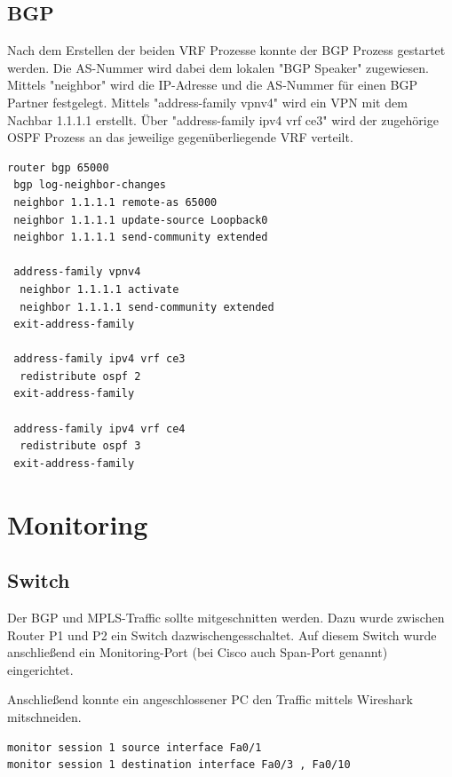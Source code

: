 \section{BGP}

Nach dem Erstellen der beiden \ac{VRF} Prozesse konnte der \ac{BGP} Prozess gestartet werden. Die \ac{AS}-Nummer wird dabei dem lokalen "\ac{BGP} Speaker" zugewiesen. Mittels "neighbor" wird die \ac{IP}-Adresse und die \ac{AS}-Nummer für einen \ac{BGP} Partner festgelegt. Mittels "address-family vpnv4" wird ein \ac{VPN} mit dem Nachbar 1.1.1.1 erstellt. Über "address-family ipv4 vrf ce3" wird der zugehörige \ac{OSPF} Prozess an das jeweilige gegenüberliegende \ac{VRF} verteilt.

\begin{lstlisting}[caption={BGP Process},label={lst:mon6},language={}]
router bgp 65000
 bgp log-neighbor-changes
 neighbor 1.1.1.1 remote-as 65000
 neighbor 1.1.1.1 update-source Loopback0
 neighbor 1.1.1.1 send-community extended
 
 address-family vpnv4
  neighbor 1.1.1.1 activate
  neighbor 1.1.1.1 send-community extended
 exit-address-family
 
 address-family ipv4 vrf ce3
  redistribute ospf 2
 exit-address-family
 
 address-family ipv4 vrf ce4
  redistribute ospf 3
 exit-address-family
\end{lstlisting}

\chapter{Monitoring}

\section{Switch}

Der \ac{BGP} und \ac{MPLS}-Traffic sollte mitgeschnitten werden.
Dazu wurde zwischen Router P1 und P2 ein Switch dazwischengesschaltet. Auf diesem Switch wurde anschließend ein Monitoring-Port (bei Cisco auch Span-Port genannt) eingerichtet.

Anschließend konnte ein angeschlossener PC den Traffic mittels Wireshark mitschneiden.

\begin{lstlisting}[caption={Monitoring-Ports},label={lst:mon7},language={}]
monitor session 1 source interface Fa0/1
monitor session 1 destination interface Fa0/3 , Fa0/10
\end{lstlisting}

